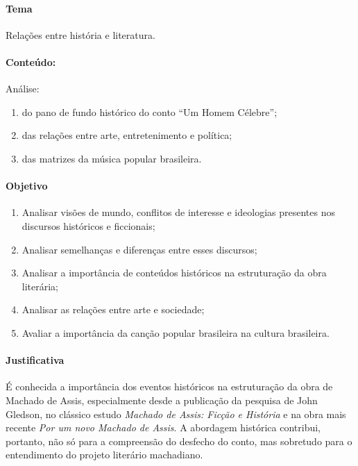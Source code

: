 \documentclass[11pt]{extarticle}
\begin{document}
\paragraph{Tema} Relações entre história e literatura.

\paragraph{Conteúdo:} Análise:
\begin{enumerate}
\item
do pano de fundo histórico do conto ``Um Homem Célebre''; 
\item
das relações entre arte, entretenimento e política; 
\item
das matrizes da música popular brasileira.
\end{enumerate}

\paragraph{Objetivo}
\begin{enumerate}
\item
Analisar visões de mundo, conflitos de interesse e
ideologias presentes nos discursos históricos e ficcionais; 
\item
Analisar
semelhanças e diferenças entre esses discursos; 
\item
Analisar a importância de conteúdos históricos na estruturação da obra literária;
\item
Analisar as relações entre arte e sociedade; 
\item
Avaliar a importância da canção popular brasileira na cultura brasileira.
\end{enumerate}

\paragraph{Justificativa} É conhecida a importância dos eventos históricos
na estruturação da obra de Machado de Assis, especialmente desde a
publicação da pesquisa de John Gledson, no clássico estudo \emph{Machado
de Assis: Ficção e História} e na obra mais recente \emph{Por um novo
Machado de Assis}. A abordagem histórica contribui, portanto, não só
para a compreensão do desfecho do conto, mas sobretudo para o
entendimento do projeto literário machadiano.

\end{document}
